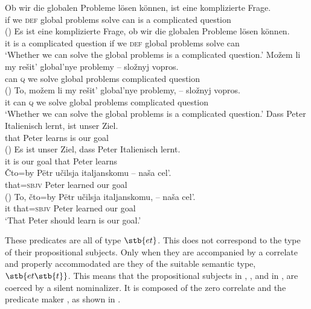 \documentclass[output=paper]{langscibook}
\begin{document}
\ea\label{ex:zimmermann:27.1}
    \ea\label{ex:zimmermann:27a'} \gll Ob wir die globalen Probleme lösen können, ist eine komplizierte Frage.\\
    if we \textsc{def} global problems solve can is a complicated question\\ \hfill ()
    \ex\label{ex:zimmermann:27a''} \gll Es ist eine komplizierte Frage, ob wir die globalen Probleme lösen können.\\
    it is a complicated question if we \textsc{def} global problems solve can\\
    \z
    \glt `Whether we can solve the global problems is a complicated question.'
\ex\label{ex:zimmermann:27.2}
    \ea\label{ex:zimmermann:27b'} \gll Možem li my rešit' global'nye problemy -- složnyj vopros.\\
    can \textsc{q} we solve global problems {} complicated question \\
    \glt \hfill ()
    \ex\label{ex:zimmermann:27b''} \gll To, možem li my rešit' global'nye problemy, -- složnyj vopros.\\
    it can \textsc{q} we solve global problems {} complicated question\\
    \z
    \glt `Whether we can solve the global problems is a complicated question.'
\ex\label{ex:zimmermann:28.1}
    \ea\label{ex:zimmermann:28a'} \gll Dass Peter Italienisch lernt, ist unser Ziel.\\
        that Peter  learns is our goal\\ \hfill ()
    \ex\label{ex:zimmermann:28a''} \gll Es ist unser Ziel, dass Peter Italienisch lernt.\\
        it is our goal that Peter  learns\\
    \z
\ex\label{ex:zimmermann:28.2}\label{ex:zimmermann:28.b}
    \ea\label{ex:zimmermann:28b'} \gll Čto=by Pëtr učilsja italjanskomu -- naša cel'.\\
        that=\textsc{sbjv} Peter learned  {} our goal\\ \hfill ()
    \ex\label{ex:zimmermann:28b''} \gll To, čto=by Pëtr učilsja italjanskomu, -- naša cel'.\\
        it that=\textsc{sbjv} Peter learned  {} our goal\\
    \z
    \glt `That Peter should learn  is our goal.'
\z

\noindent These predicates are all of type $\stb{et}$. This does not correspond to the type of their propositional subjects. Only when they are accompanied by a correlate and properly accommodated are they of the suitable semantic type, $\stb{et\stb{t}}$. This means that the propositional subjects in , , and in ,  are coerced by a silent nominalizer. It is composed of the zero correlate  and the predicate maker , as shown in .
\end{document}
